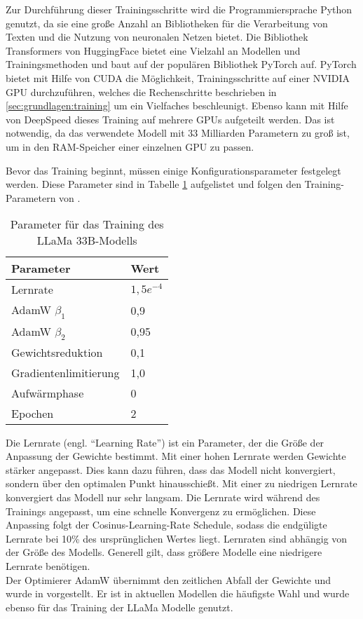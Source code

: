 Zur Durchführung dieser Trainingsschritte wird die Programmiersprache Python genutzt, da sie eine große Anzahl an Bibliotheken für die Verarbeitung von Texten und die Nutzung von neuronalen Netzen bietet.
Die Bibliothek Transformers von HuggingFace bietet eine Vielzahl an Modellen und Trainingsmethoden und baut auf der populären Bibliothek PyTorch auf.
PyTorch bietet mit Hilfe von CUDA die Möglichkeit, Trainingsschritte auf einer NVIDIA GPU durchzuführen, welches die Rechenschritte beschrieben in \ref{sec:grundlagen:training} um ein Vielfaches beschleunigt.
Ebenso kann mit Hilfe von DeepSpeed dieses Training auf mehrere GPUs aufgeteilt werden.
Das ist notwendig, da das verwendete Modell mit 33 Milliarden Parametern zu groß ist, um in den RAM-Speicher einer einzelnen GPU zu passen.

Bevor das Training beginnt, müssen einige Konfigurationsparameter festgelegt werden.
Diese Parameter sind in Tabelle \ref{tab:training:parameter} aufgelistet und folgen den Training-Parametern von \citet{llama}.\\

\begin{table}
    \centering
    \begin{tabular}{ll}
        \hline
        \textbf{Parameter} & \textbf{Wert} \\
        \hline
        Lernrate & $1,5e^{-4}$\\
        AdamW $\beta_1$ & 0,9\\
        AdamW $\beta_2$ & 0,95\\
        Gewichtsreduktion & 0,1\\
        Gradientenlimitierung & 1,0\\
        Aufwärmphase & 0\\
        Epochen & 2\\
        \hline
    \end{tabular}
    \caption{Parameter für das Training des LLaMa 33B-Modells}
    \label{tab:training:parameter}
\end{table}

Die Lernrate (engl.
\enquote{Learning Rate}) ist ein Parameter, der die Größe der Anpassung der Gewichte bestimmt.
Mit einer hohen Lernrate werden Gewichte stärker angepasst.
Dies kann dazu führen, dass das Modell nicht konvergiert, sondern über den optimalen Punkt hinausschießt.
Mit einer zu niedrigen Lernrate konvergiert das Modell nur sehr langsam.
Die Lernrate wird während des Trainings angepasst, um eine schnelle Konvergenz zu ermöglichen.
Diese Anpassing folgt der Cosinus-Learning-Rate Schedule, sodass die endgüligte Lernrate bei 10\% des ursprünglichen Wertes liegt.
Lernraten sind abhängig von der Größe des Modells.
Generell gilt, dass größere Modelle eine niedrigere Lernrate benötigen.\\
Der Optimierer AdamW übernimmt den zeitlichen Abfall der Gewichte und wurde  in \citet{adamw} vorgestellt.
Er ist in aktuellen Modellen die häufigste Wahl und wurde ebenso für das Training der LLaMa Modelle genutzt.\\

